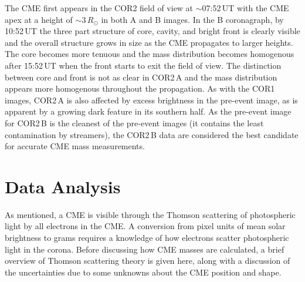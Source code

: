 The CME first appears in the COR2 field of view at $\sim$07:52\,UT with the CME apex at a height of $\sim$3\,$R_{\odot}$ in both A and B images. In the B coronagraph, by 10:52\,UT the three part structure of core, cavity, and bright front is clearly visible and the overall structure grows in size as the CME propagates to larger heights. The core becomes more tenuous and the mass distribution becomes homogenous after 15:52\,UT when the front starts to exit the field of view. The distinction between core and front is not as clear in COR2\,A and the mass distribution appears more homogenous throughout the propagation. As with the COR1 images, COR2\,A is also affected by excess brightness in the pre-event image, as is apparent by a growing dark feature in its southern half. As the pre-event image for COR2\,B is the cleanest of the pre-event images (it contains the least contamination by streamers), the COR2\,B data are considered the best candidate for accurate CME mass measurements. 



\section{Data Analysis}\label{sec:10}

As mentioned, a CME is visible through the Thomson scattering of photospheric light by all electrons in the CME.
A conversion from pixel units of mean solar brightness to grams requires a knowledge of how electrons scatter photospheric light in the corona. Before discussing how CME masses are calculated, a brief overview of Thomson scattering theory is given here, along with a discussion of the uncertainties due to some unknowns about the CME position and shape.

